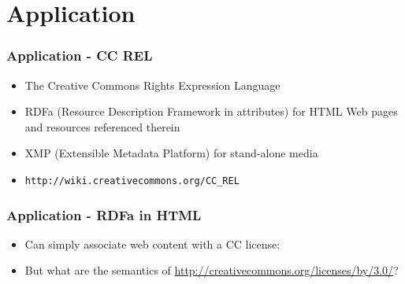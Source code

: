 \documentclass[t, xcolor=dvipsnames, handout, 10pt]{beamer}
\begin{document}
\section{Application}
\begin{frame}[t]
    \frametitle{Application - CC REL}
    \begin{itemize}
        \item The Creative Commons Rights Expression Language
        \item RDFa (Resource Description Framework in attributes) for HTML
        Web pages and resources referenced therein
        \item XMP (Extensible Metadata Platform) for stand-alone media
        \item \texttt{http://wiki.creativecommons.org/CC\_REL}
    \end{itemize}
\end{frame}

\begin{frame}[fragile]
\frametitle{Application - RDFa in HTML}
        \begin{itemize}
            \item Can simply associate web content with a CC license:
        \end{itemize}

        \begin{itemize}
            \item But what are the semantics of \url{http://creativecommons.org/licenses/by/3.0/}?
        \end{itemize}
\end{frame}
\end{document}
